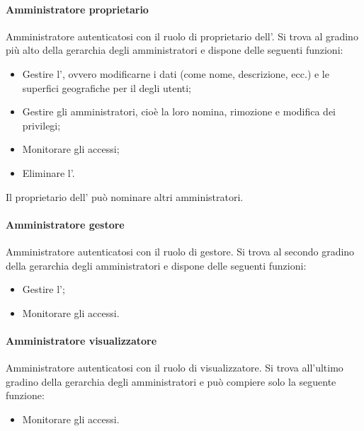 \paragraph{Amministratore proprietario}
Amministratore autenticatosi con il ruolo di proprietario dell'.
Si trova al gradino più alto della gerarchia degli amministratori e dispone delle seguenti funzioni:
\begin{itemize}
\item Gestire l', ovvero modificarne i dati (come nome, descrizione, ecc.) e le superfici geografiche per il  degli utenti;
\item Gestire gli amministratori, cioè la loro nomina, rimozione e modifica dei privilegi;
\item Monitorare gli accessi;
\item Eliminare l'.
\end{itemize}
Il proprietario dell' può nominare altri amministratori.
\paragraph{Amministratore gestore}
Amministratore autenticatosi con il ruolo di gestore. 
Si trova al secondo gradino della gerarchia degli amministratori e dispone delle seguenti funzioni:
\begin{itemize}
\item Gestire l';
\item Monitorare gli accessi.
\end{itemize}
\paragraph{Amministratore visualizzatore}
Amministratore autenticatosi con il ruolo di visualizzatore.
Si trova all'ultimo gradino della gerarchia degli amministratori e può compiere solo la seguente funzione:
\begin{itemize}
\item Monitorare gli accessi.
\end{itemize}




